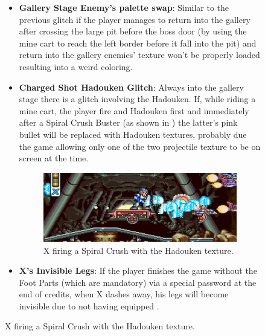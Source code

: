 \begin{figure}[htp]
\begin{itemize}
\begin{figure}[htp]
		\caption{X near Factory Stage's glitched Sub-Tank. Note how the background also has a different color.}
	\end{figure}
	\item \textbf{Gallery Stage Enemy's palette swap}: Similar to the previous glitch if the player manages to return into the gallery after crossing the large pit before the boss door (by using the mine cart to reach the left border before it fall into the pit) and return into the gallery enemies' texture won't be properly loaded resulting into a weird coloring.
	\item \textbf{Charged Shot Hadouken Glitch}: Always into the gallery stage there is a glitch involving the Hadouken. If, while riding a mine cart, the player fire and Hadouken first and immediately after a Spiral Crush Buster (as shown in ) the latter's pink bullet will be replaced with Hadouken textures, probably due the game allowing only one of the two projectile texture to be on screen at the time.
	\begin{figure}[htp]
		\centering
		\includegraphics[width=0.5\linewidth]{figures/X1/Miscs/Charged_hadouken_glitch.jpg}
		\caption{X firing a Spiral Crush with the Hadouken texture.}
	\end{figure}
	\item \textbf{X's Invisible Legs}: If the player finishes the game without the Foot Parts (which are mandatory) via a special password at the end of credits, when X dashes away, his legs will become invisible due to not having equipped .
\end{itemize}

\end{figure}
